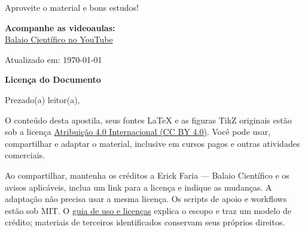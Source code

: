 Aproveite o material e bons estudos!

\vfill

\noindent \textbf{Acompanhe as videoaulas:}\\
\faYoutube{} \href{https://www.youtube.com/channel/UCzHAqwm3RSDM-YKdxd4XYTg}{Balaio Científico no YouTube}

\vfill
\centerline{Atualizado em: {\noindent \today}}

\newpage


\begin{center}
\Huge\textbf{Licença do Documento}
\end{center}

Prezado(a) leitor(a),

O conteúdo desta apostila, seus fontes LaTeX e as figuras TikZ originais estão sob a licença \href{https://creativecommons.org/licenses/by/4.0/deed.pt-br}{Atribuição 4.0 Internacional (CC BY 4.0)}. Você pode usar, compartilhar e adaptar o material, inclusive em cursos pagos e outras atividades comerciais.

Ao compartilhar, mantenha os créditos a Erick Faria --- Balaio Científico e os avisos aplicáveis, inclua um link para a licença e indique as mudanças. A adaptação não precisa usar a mesma licença. Os scripts de apoio e workflows estão sob MIT. O \href{https://github.com/erickfaria/apostilaJamovi/blob/main/docs/LICENCIAMENTO.md}{guia de uso e licenças} explica o escopo e traz um modelo de crédito; materiais de terceiros identificados conservam seus próprios direitos.

